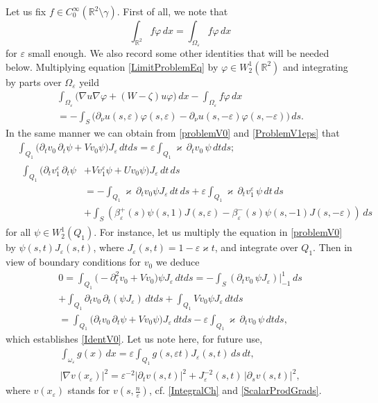 \documentclass[reqno]{amsart}
\theoremstyle{plain}
\numberwithin{equation}{section}
\renewcommand{\kappa}{\varkappa}
\newcommand{\Real}{\mathbb R}
\newcommand{\eps}{\varepsilon}
\renewcommand{\phi}{\varphi}
\newcommand\nep{\textstyle\frac n\eps}
\begin{document}
Let us fix $f\in C_0^\infty(\Real^2\setminus\gamma)$.
First of all, we note that
\begin{equation}\label{IntR2=IntOmEps}
  \int_{\Real^2}f\phi\,dx=\int_{\Omega_\eps}f\phi\,dx
\end{equation}
for $\eps$ small enough.
We also record some other identities that will be needed below.
Multiplying equation \eqref{LimitProblemEq} by $\phi\in W_2^1(\Real^2)$ and integrating by parts over $\Omega_\eps$ yeild
\begin{multline}\label{IdentU}
\int_{\Omega_\eps}\big(\nabla u \nabla \phi+(W-\zeta)u\phi \big)\,dx-\int_{\Omega_\eps}f\phi\,dx\\
=-\int_S \big(\partial_\nu u(s,\eps)\phi(s,\eps)-\partial_\nu u(s,-\eps)\phi(s,-\eps) \big)\,ds.
\end{multline}
In the same manner we can obtain from \eqref{problemV0} and \eqref{ProblemV1eps} that
\begin{align}\label{IdentV0}
&\int_{Q_1}\big(\partial_t v_0 \,\partial_t \psi
+Vv_0 \psi\big)J_\eps\,dt ds
=\eps \int_{Q_1} \kappa\,\partial_t v_0\, \psi \,dt ds;
\\\label{IdentV1}
&\begin{aligned}
\int_{Q_1}\big(\partial_t v_1^\eps \,\partial_t \psi
&+Vv_1^\eps \psi+Uv_0\psi\big)J_\eps\,dt\, ds
\\
&=-\int_{Q_1}\kappa \,\partial_t v_0\psi J_\eps\,dt\, ds+\eps\int_{Q_1}\kappa \,\partial_t v_1^\eps\, \psi\,dt\, ds
\\
&+\int_S\left(\beta_\eps^+(s)\psi(s,1)J(s,\eps)
-\beta_\eps^-(s)\psi(s,-1)J(s,-\eps)\right)\,ds
\end{aligned}
\end{align}
for all $\psi\in W_2^1(Q_1)$.
For instance, let us multiply the equation in \eqref{problemV0} by $\psi(s,t)J_\eps(s,t)$, where $J_\eps(s,t)=1-\eps\kappa t$, and integrate over $Q_1$. Then in view of boundary conditions for $v_0$ we deduce
\begin{multline*}
0=\int_{Q_1}\big(-\partial_t^2 v_0+Vv_0\big) \psi J_\eps\,dt ds=-\int_S (\partial_t v_0 \,\psi J_\eps)\big|_{-1}^1\,ds
  \\
  +
\int_{Q_1}\partial_t v_0 \,\partial_t (\psi J_\eps)\,dt ds
+\int_{Q_1}Vv_0 \psi J_\eps\,dt ds
\\
=\int_{Q_1}\big(\partial_t v_0 \,\partial_t \psi
+Vv_0 \psi\big)J_\eps\,dt ds
-\eps \int_{Q_1} \kappa\,\partial_t v_0\, \psi \,dt ds,
\end{multline*}
which establishes \eqref{IdentV0}.
Let us note here, for future use,
\begin{gather}\label{IntXtoIntST}
 \int_{\omega_\eps} g(x)\,dx=\eps \int_{Q_1} g(s,\eps t)J_\eps(s,t)\,ds\,dt,\\\label{LocalGrad}
|\nabla v(x_\eps)|^2=\eps^{-2}|\partial_t v(s,t)|^2+J^{-2}_\eps(s,t)\,|\partial_s v(s,t)|^2,
\end{gather}
where $v(x_\eps)$ stands for $v(s,\nep)$, cf. \eqref{IntegralCh} and \eqref{ScalarProdGrads}.
\end{document}
